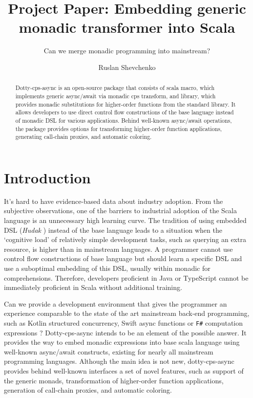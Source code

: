 \documentclass{llncs}
\title{ Project Paper: Embedding generic monadic transformer into Scala }
\subtitle{ Can we merge monadic programming into mainstream? }
\author{ Ruslan Shevchenko 
 \orcidID{ 0000-0002-1554-2019 }
}
\institute{
  Institute of Software Systems \\
  of National Academy of Sciences of Ukraine\\
  \email{ ruslan@shevchenko.kiev.ua }
}
\begin{document}
\maketitle

\begin{abstract}
  Dotty-cps-async is an open-source package that consists of scala macro, which implements generic async/await via monadic cps transform, and library, which provides monadic substitutions for higher-order functions from the standard library. It allows developers to use direct control flow constructions of the base language instead of monadic DSL for various applications. Behind well-known async/await operations, the package provides options for transforming higher-order function applications, generating call-chain proxies, and automatic coloring.
\end{abstract}



\section{ Introduction }

  It's hard to have evidence-based data about industry adoption.  From the subjective observations,  one of the barriers to industrial adoption of the Scala language is an unnecessary high learning curve. 
 The tradition of using embedded DSL ({\it Hudak} \cite{10.1145/242224.242477}) instead of the base language leads to a situation when the ‘cognitive load’  of relatively simple development tasks, such as querying an extra resource, is higher than in mainstream languages. A programmer cannot use control flow constructions of base language but should learn a specific DSL and use a suboptimal embedding of this DSL, usually within monadic for comprehensions. Therefore, developers proficient in Java or TypeScript cannot be immediately proficient in Scala without additional training.

 Can we provide a development environment that gives the programmer an experience comparable to the state of the art mainstream back-end programming, such as Kotlin structured concurrency, Swift async functions or \verb|F#| computation expressions ? 
 Dotty-cps-async intends to be an element of the possible answer.  It provides the way to embed monadic expressions into base scala language using well-known async/await constructs, existing for nearly all mainstream programming languages.  Although the main idea is not new, dotty-cps-async provides behind well-known interfaces a set of novel features,  such as support of the generic monads, transformation of higher-order function applications, generation of call-chain proxies, and automatic coloring.   
\end{document}
